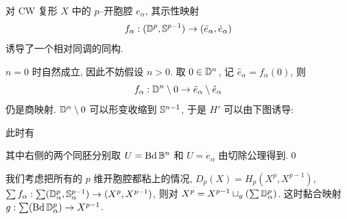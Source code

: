 \begin{Lemma}
	对 CW 复形 $ X $ 中的 $ p $--开胞腔 $ e_\alpha $, 其示性映射
	\[
		f_\alpha : (\D^p,\S^{p-1})\to(\bar{e}_\alpha,\dot{e}_\alpha)
	\]
	诱导了一个相对同调的同构.
\end{Lemma}
\begin{Proof}
	$ n=0 $ 时自然成立, 因此不妨假设 $ n>0 $. 取 $ 0\in\D^n $, 记 $ \hat{e}_\alpha=f_\alpha(0) $, 则
	\[
		f_\alpha : \D^n\sm 0\to\bar{e}_\alpha\sm\hat{e}_\alpha
	\]
	仍是商映射. $ \D^n\sm 0 $ 可以形变收缩到 $ \S^{n-1} $, 于是 $ H' $ 可以由下图诱导:
	\begin{center}
	\end{center}
	此时有
	\begin{center}
	\end{center}
	其中右侧的两个同胚分别取 $ U=\Bd\B^n $ 和 $ U=\dot{e}_\alpha $ 由切除公理得到.\qed
\end{Proof}

我们考虑把所有的 $ p $ 维开胞腔都粘上的情况, $ D_p(X)=H_p(X^p,X^{p-1}) $, $ \sum f_\alpha : \sum(\D^p_\alpha,\S_\alpha^{p-1})\to(X^p,X^{p-1}) $, 则对 $ X^p=X^{p-1}\sqcup_g(\sum\D_\alpha^p) $. 这时黏合映射 $ g : \sum(\Bd\D_\alpha^p)\to X^{p-1} $.

